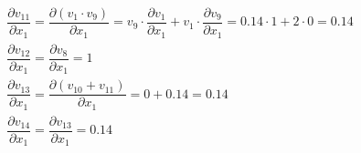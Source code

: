 \documentclass[12pt]{article}
\begin{document}
\begin{enumerate}[label=(\roman*)]
\begin{fleqn}
\begin{gather*}
        \dfrac{\partial v_{11}}{\partial x_{1}} = \dfrac{\partial (v_{1}\cdot v_9)}{\partial x_{1}} = v_9\cdot\dfrac{\partial v_{1}}{\partial x_{1}} + v_1\cdot\dfrac{\partial v_{9}}{\partial x_{1}} = 0.14 \cdot 1 + 2\cdot 0 = 0.14  \\
        \dfrac{\partial v_{12}}{\partial x_{1}} = \dfrac{\partial v_{8}}{\partial x_{1}} = 1  \\
        \dfrac{\partial v_{13}}{\partial x_{1}} = \dfrac{\partial (v_{10} + v_{11})}{\partial x_{1}} = 0 + 0.14 = 0.14  \\
        \dfrac{\partial v_{14}}{\partial x_{1}} = \dfrac{\partial v_{13}}{\partial x_{1}}  = 0.14 \\
    \end{gather*}
\end{fleqn}


\end{enumerate}
\end{document}
